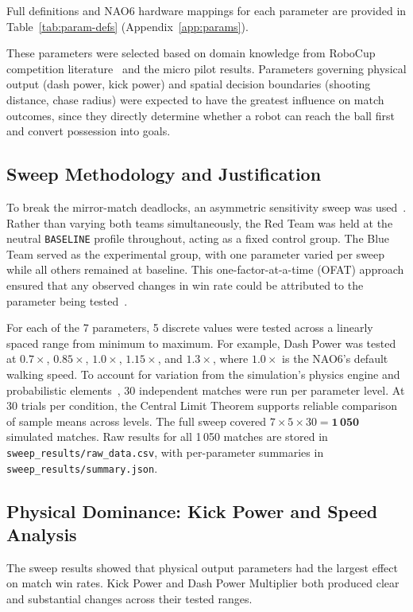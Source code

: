 \documentclass[12pt, a4paper]{report}
\begin{document}
Full definitions and NAO6 hardware mappings for each parameter are provided
in Table~\ref{tab:param-defs} (Appendix~\ref{app:params}).

These parameters were selected based on domain knowledge from RoboCup
competition literature~\cite{robocup2024} and the micro pilot results.
Parameters governing physical output (dash power, kick power) and spatial
decision boundaries (shooting distance, chase radius) were expected to have
the greatest influence on match outcomes, since they directly determine
whether a robot can reach the ball first and convert possession into goals.


\subsection{Sweep Methodology and Justification}

To break the mirror-match deadlocks, an asymmetric sensitivity
sweep was used~\cite{montgomery2017}.
Rather than varying both teams simultaneously, the Red Team was held at the
neutral \texttt{BASELINE} profile throughout, acting as a fixed control
group.
The Blue Team served as the experimental group, with one parameter varied
per sweep while all others remained at baseline.
This one-factor-at-a-time (OFAT) approach ensured that any observed changes
in win rate could be attributed to the parameter being
tested~\cite{czitrom1999}.

For each of the 7 parameters, 5 discrete values were tested across a
linearly spaced range from minimum to maximum. For example, Dash Power was
tested at $0.7\times$, $0.85\times$, $1.0\times$, $1.15\times$, and
$1.3\times$, where $1.0\times$ is the NAO6's default walking speed.
To account for variation from the simulation's physics engine and
probabilistic elements~\cite{webots2024}, 30 independent matches were run
per parameter level.
At 30 trials per condition, the Central Limit Theorem supports reliable
comparison of sample means across levels.
The full sweep covered $7 \times 5 \times 30 = \mathbf{1\,050}$ simulated
matches. Raw results for all 1\,050 matches are stored in
\texttt{sweep\_results/raw\_data.csv}, with per-parameter summaries in
\texttt{sweep\_results/summary.json}.

\subsection{Physical Dominance: Kick Power and Speed Analysis}

The sweep results showed that physical output parameters had the largest
effect on match win rates.
Kick Power and Dash Power Multiplier both produced clear and substantial
changes across their tested ranges.
\end{document}
